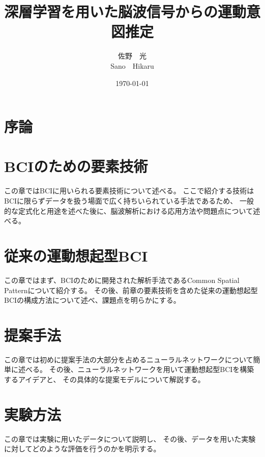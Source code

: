 \documentclass[a4paper,11pt,oneside,openany, report]{jsbook}
\title{深層学習を用いた脳波信号からの運動意図推定}
\author{佐野\ \ 光 \\ Sano\ \ Hikaru}
\date{\today}
\begin{document}
%


%
\maketitle
%
%
\frontmatter


% 
\setcounter{tocdepth}{2}
\tableofcontents
%
%
\mainmatter

\chapter{序論}



\chapter{BCIのための要素技術}
\label{chapter:BCIのための要素技術}
この章ではBCIに用いられる要素技術について述べる。
ここで紹介する技術はBCIに限らずデータを扱う場面で広く持ちいられている手法であるため、
一般的な定式化と用途を述べた後に、脳波解析における応用方法や問題点について述べる。





\chapter{従来の運動想起型BCI}
この章ではまず、BCIのために開発された解析手法であるCommon Spatial Patternについて紹介する。
その後、前章の要素技術を含めた従来の運動想起型BCIの構成方法について述べ、課題点を明らかにする。




\chapter{提案手法}
この章では初めに提案手法の大部分を占めるニューラルネットワークについて簡単に述べる。
その後、ニューラルネットワークを用いて運動想起型BCIを構築するアイデアと、
その具体的な提案モデルについて解説する。

\chapter{実験方法}
この章では実験に用いたデータについて説明し、
その後、データを用いた実験に対してどのような評価を行うのかを明示する。
\end{document}
